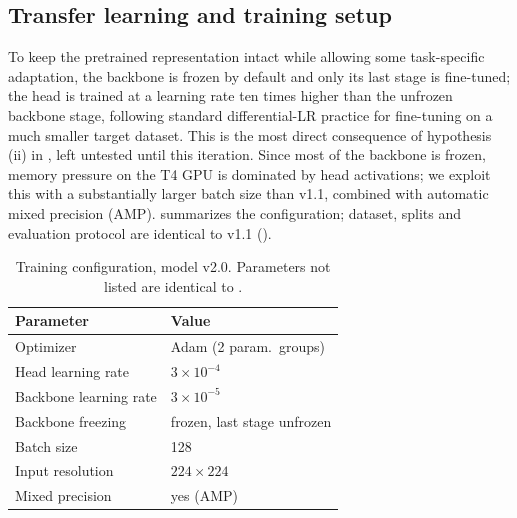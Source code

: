 \subsection{Transfer learning and training setup}
\label{subsec:transfer20}
\label{subsec:training20}

To keep the pretrained representation intact while allowing some task-specific adaptation, the backbone is frozen by default and only its last stage is fine-tuned; the head is trained at a learning rate ten times higher than the unfrozen backbone stage, following standard differential-LR practice for fine-tuning on a much smaller target dataset. This is the most direct consequence of hypothesis (ii) in , left untested until this iteration. Since most of the backbone is frozen, memory pressure on the T4 GPU is dominated by head activations; we exploit this with a substantially larger batch size than v1.1, combined with automatic mixed precision (AMP).  summarizes the configuration; dataset, splits and evaluation protocol are identical to v1.1 ().

\begin{table}[t]
\centering
\caption{Training configuration, model v2.0. Parameters not listed are identical to .}
\label{tab:train20}
\begin{tabular}{@{}ll@{}}
\toprule
\textbf{Parameter} & \textbf{Value} \\
\midrule
Optimizer & Adam (2 param.\ groups) \\
Head learning rate & $3\times10^{-4}$ \\
Backbone learning rate & $3\times10^{-5}$ \\
Backbone freezing & frozen, last stage unfrozen \\
Batch size & 128 \\
Input resolution & $224\times224$ \\
Mixed precision & yes (AMP) \\
\bottomrule
\end{tabular}
\end{table}
